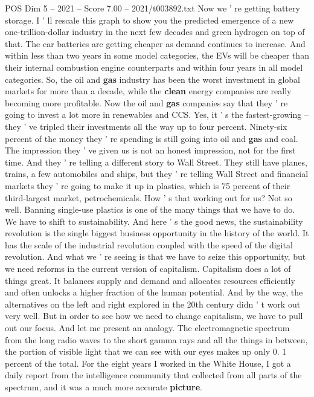 \begin{textsample}{POS Dim 5 – 2021 – Score 7.00 – 2021/t003892.txt}
Now we ' re getting battery storage.
I ' ll rescale this graph to show you the predicted emergence of a new one-trillion-dollar industry in the next few decades and green hydrogen on top of that.
The car batteries are getting cheaper as demand continues to increase.
And within less than two years in some model categories, the EVs will be cheaper than their internal combustion engine counterparts and within four years in all model categories.
So, the oil and \textbf{gas} industry has been the worst investment in global markets for more than a decade, while the \textbf{clean} energy companies are really becoming more profitable.
Now the oil and \textbf{gas} companies say that they ' re going to invest a lot more in renewables and CCS.
Yes, it ' s the fastest-growing -- they ' ve tripled their investments all the way up to four percent.
Ninety-six percent of the money they ' re spending is still going into oil and \textbf{gas} and coal.
The impression they ' ve given us is not an honest impression, not for the first time.
And they ' re telling a different story to Wall Street.
They still have planes, trains, a few automobiles and ships, but they ' re telling Wall Street and financial markets they ' re going to make it up in plastics, which is 75 percent of their third-largest market, petrochemicals.
How ' s that working out for us?
Not so well.
Banning single-use plastics is one of the many things that we have to do.
We have to shift to sustainability.
And here ' s the good news, the sustainability revolution is the single biggest business opportunity in the history of the world.
It has the scale of the industrial revolution coupled with the speed of the digital revolution.
And what we ' re seeing is that we have to seize this opportunity, but we need reforms in the current version of capitalism.
Capitalism does a lot of things great.
It balances supply and demand and allocates resources efficiently and often unlocks a higher fraction of the human potential.
And by the way, the alternatives on the left and right explored in the 20th century didn ' t work out very well.
But in order to see how we need to change capitalism, we have to pull out our focus.
And let me present an analogy.
The electromagnetic spectrum from the long radio waves to the short gamma rays and all the things in between, the portion of visible light that we can see with our eyes makes up only 0. 1 percent of the total.
For the eight years I worked in the White House, I got a daily report from the intelligence community that collected from all parts of the spectrum, and it was a much more accurate \textbf{picture}.

\end{textsample}
